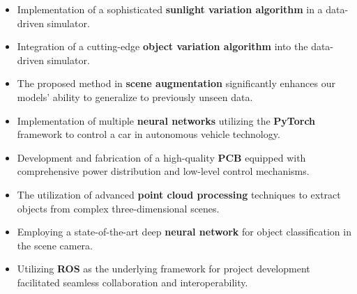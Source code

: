 \documentclass[10pt,a4paper]{altacv}
\begin{document}

\begin{itemize}
\item Implementation of a sophisticated \textbf{sunlight variation algorithm} in a data-driven simulator.  
\item  Integration of a cutting-edge \textbf{object variation algorithm} into the data-driven simulator.
\item The proposed method in \textbf{scene augmentation} significantly enhances our models' ability to generalize to previously unseen data.
\end{itemize}
\medskip

\begin{itemize}
\item Implementation of multiple \textbf{neural networks} utilizing the \textbf{PyTorch} framework to control a car in autonomous vehicle technology.
\item Development and fabrication of a high-quality \textbf{PCB} equipped with comprehensive power distribution and low-level control mechanisms.
\end{itemize}
\medskip
{}
\begin{itemize}
\item The utilization of advanced \textbf{point cloud processing} techniques to extract objects from complex three-dimensional scenes.
\item Employing a state-of-the-art deep \textbf{neural network} for object classification in the scene camera.
\item Utilizing \textbf{ROS} as the underlying framework for project development facilitated seamless collaboration and interoperability.
\end{itemize}
\medskip






\clearpage




\end{document}
